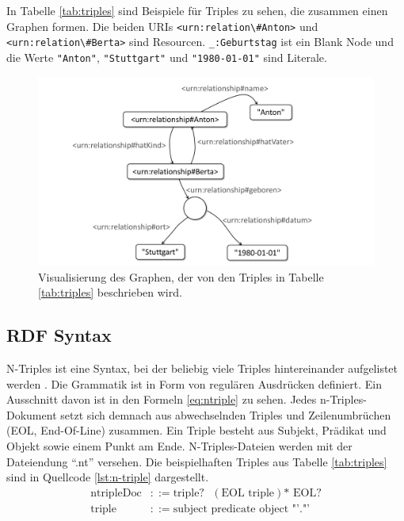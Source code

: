 In Tabelle \ref{tab:triples} sind Beispiele für Triples zu sehen, die zusammen einen Graphen formen. Die beiden URIs \lstinline|<urn:relation\#Anton>| und \lstinline|<urn:relation\#Berta>| sind Resourcen. \lstinline|_:Geburtstag| ist ein Blank Node und die Werte \lstinline|"Anton"|, \lstinline|"Stuttgart"| und \lstinline|"1980-01-01"| sind Literale.



\begin{figure}
	\centering
	\includegraphics[width=0.7\linewidth]{resources/figures/rdfGraph}
	\caption{Visualisierung des Graphen, der von den Triples in Tabelle \ref{tab:triples} beschrieben wird. }
	\label{fig:rdfgraph}
\end{figure}


\subsection{RDF Syntax}

N-Triples ist eine Syntax, bei der beliebig viele Triples hintereinander aufgelistet werden \cite[vgl.][]{w3c2014ntriples}. Die Grammatik ist in Form von regulären Ausdrücken definiert. Ein Ausschnitt davon ist in den Formeln \ref{eq:ntriple} zu sehen. Jedes n-Triples-Dokument setzt sich demnach aus abwechselnden Triples und Zeilenumbrüchen (EOL, End-Of-Line) zusammen. Ein Triple besteht aus Subjekt, Prädikat und Objekt sowie einem Punkt am Ende. N-Triples-Dateien werden mit der Dateiendung "`.nt"' versehen. Die beispielhaften Triples aus Tabelle \ref{tab:triples} sind in Quellcode \ref{lst:n-triple} dargestellt.
\begin{align}
	\text{ntripleDoc} & ::= \text{triple?}\text{ } (\text{EOL triple})\mbox{*} \text{ EOL?} \label{eq:ntriple}\\
	\text{triple} & ::= \text{subject } \text{predicate } \text{object } \text{"'."'} \nonumber
\end{align}

